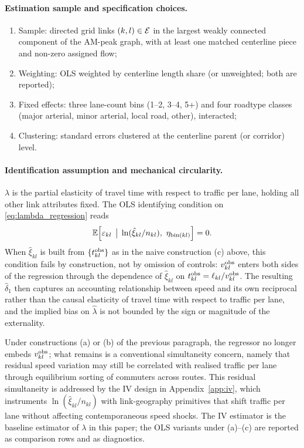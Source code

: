 \paragraph{Estimation sample and specification choices.}
\begin{enumerate}[label=(\alph*),leftmargin=2em,itemsep=0.15em]
  \item Sample: directed grid links $(k,l)\in\mathcal E$ in the largest
        weakly connected component of the AM-peak graph, with at
        least one matched centerline piece and non-zero assigned
        flow;
  \item Weighting: OLS weighted by centerline length share (or
        unweighted; both are reported);
  \item Fixed effects: three lane-count bins (1--2, 3--4, 5+) and
        four roadtype classes (major arterial, minor arterial, local
        road, other), interacted;
  \item Clustering: standard errors clustered at the centerline
        parent (or corridor) level.
\end{enumerate}

\paragraph{Identification assumption and mechanical circularity.}
$\lambda$ is the partial elasticity of travel time with respect to
traffic per lane, holding all other link attributes fixed.  The OLS
identifying condition on \eqref{eq:lambda_regression} reads
\[
  \mathbb E\!\left[\varepsilon_{kl}\,\bigm|\,\ln(\hat\xi_{kl}/n_{kl}),\
  \eta_{\mathrm{bin}(kl)}\right]=0.
\]
When $\hat\xi_{kl}$ is built from $\{t_{kl}^{\mathrm{obs}}\}$ as in the naive
construction (c) above, this condition fails by construction, not by
omission of controls: $v_{kl}^{\mathrm{obs}}$ enters both sides of the
regression through the dependence of $\hat\xi_{kl}$ on
$t_{kl}^{\mathrm{obs}}=\ell_{kl}/v_{kl}^{\mathrm{obs}}$.  The resulting $\hat\delta_1$
then captures an accounting relationship between speed and its own
reciprocal rather than the causal elasticity of travel time with
respect to traffic per lane, and the implied bias on $\hat\lambda$ is
not bounded by the sign or magnitude of the externality.

Under constructions (a) or (b) of the previous paragraph, the
regressor no longer embeds $v_{kl}^{\mathrm{obs}}$; what remains is a
conventional simultaneity concern, namely that residual speed
variation may still be correlated with realised traffic per lane
through equilibrium sorting of commuters across routes.  This
residual simultaneity is addressed by the IV design in
Appendix~\ref{app:iv}, which instruments $\ln(\hat\xi_{kl}/n_{kl})$
with link-geography primitives that shift traffic per lane without
affecting contemporaneous speed shocks.  The IV estimator is the
baseline estimator of $\lambda$ in this paper; the OLS variants
under (a)--(c) are reported as comparison rows and as diagnostics.

